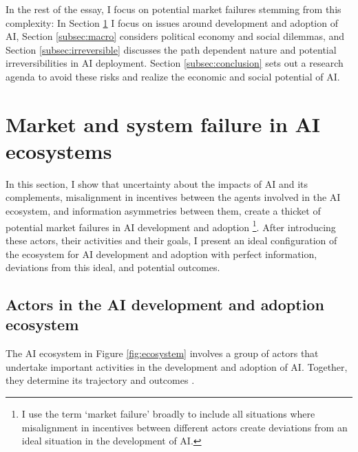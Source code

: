 \documentclass[11pt]{article}
\begin{document}
In the rest of the essay, I focus on potential market failures stemming from this complexity: In Section \ref{sec:micro} I focus on issues around development and adoption of AI, Section \ref{subsec:macro} considers political economy and social dilemmas, and Section \ref{subsec:irreversible} discusses the path dependent nature and potential irreversibilities in AI deployment. Section \ref{subsec:conclusion} sets out a research agenda to avoid these risks and realize the economic and social potential of AI.

\section{Market and system failure in AI ecosystems}
\label{sec:micro}
In this section, I show that uncertainty about the impacts of AI and its complements, misalignment in incentives between the agents involved in the AI ecosystem, and information asymmetries between them, create a thicket of potential market failures in AI development and adoption \footnote{I use the term `market failure' broadly to include all situations where misalignment in incentives between different actors create deviations from an ideal situation in the development of AI.}. After introducing these actors, their activities and their goals, I present an ideal configuration of the ecosystem for AI development and adoption with perfect information, deviations from this ideal, and potential outcomes.

\subsection{Actors in the AI development and adoption ecosystem}
The AI ecosystem in Figure \ref{fig:ecosystem} involves a group of actors that undertake important activities in the development and adoption of AI. Together, they determine its trajectory and outcomes .
\end{document}
